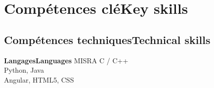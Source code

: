 \vspace{-1.3cm}

\ifnativelang
\newcommand{\CVheader}{6+ ann\'ees d'exp\'erience en ing\'enierie des syst\`emes embarqu\'es et r\'eseaux.\\%
Expérience en conduite d’équipe et normes médicales.}
\else
\newcommand{\CVheader}{6+ years of experience in Real-Time systems, embedded linux and networking.\\
Experience in project steering and team management.}
\fi


\section{\ifnativelang Comp\'etences cl\'e\else Key skills\fi}
\subsection{\ifnativelang Comp\'etences techniques\else Technical skills\fi}

{\ifnativelang\textbf{Langages}\else \textbf{Languages}\fi}{
 MISRA C / C++\\
 Python, Java \\
 Angular, HTML5, CSS
}

\vspace{\ItemsSpacing}

